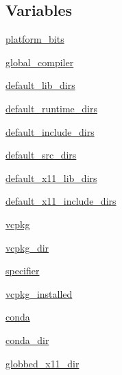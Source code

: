 \subsection*{Variables}
\begin{DoxyCompactItemize}
\item 
\hyperlink{namespacenumpy_1_1distutils_1_1system__info_a49973a987c3df34db822c3ed2da72f46}{platform\+\_\+bits}
\item 
\hyperlink{namespacenumpy_1_1distutils_1_1system__info_ac9242dc3ee8e9fc80481c8f0760fd765}{global\+\_\+compiler}
\item 
\hyperlink{namespacenumpy_1_1distutils_1_1system__info_ac60e6bb3dff22d8f4f250d1b4ba42899}{default\+\_\+lib\+\_\+dirs}
\item 
\hyperlink{namespacenumpy_1_1distutils_1_1system__info_a74309deda7e692fb45c89259009e7f12}{default\+\_\+runtime\+\_\+dirs}
\item 
\hyperlink{namespacenumpy_1_1distutils_1_1system__info_ad2cd2857056589dcb7cacb98be3d2b20}{default\+\_\+include\+\_\+dirs}
\item 
\hyperlink{namespacenumpy_1_1distutils_1_1system__info_a978557208c63efe4a826bee1f28eea4e}{default\+\_\+src\+\_\+dirs}
\item 
\hyperlink{namespacenumpy_1_1distutils_1_1system__info_adf31d5301e19d6a07260c1d4340cdb43}{default\+\_\+x11\+\_\+lib\+\_\+dirs}
\item 
\hyperlink{namespacenumpy_1_1distutils_1_1system__info_a8683212769cda6284c253c839b70dfd5}{default\+\_\+x11\+\_\+include\+\_\+dirs}
\item 
\hyperlink{namespacenumpy_1_1distutils_1_1system__info_a331508e056be601db0c53289f0e81edb}{vcpkg}
\item 
\hyperlink{namespacenumpy_1_1distutils_1_1system__info_af3d935af50b3590fe584a2f40a196ebb}{vcpkg\+\_\+dir}
\item 
\hyperlink{namespacenumpy_1_1distutils_1_1system__info_a2ad77a01032a052ac1f513a680c0b6bb}{specifier}
\item 
\hyperlink{namespacenumpy_1_1distutils_1_1system__info_a4120d506b88553509d16eda8f1c8610d}{vcpkg\+\_\+installed}
\item 
\hyperlink{namespacenumpy_1_1distutils_1_1system__info_a143f78ae85d53d3e0ba4ff4603532a79}{conda}
\item 
\hyperlink{namespacenumpy_1_1distutils_1_1system__info_a6086443465762a7d15a3644de91e3c9b}{conda\+\_\+dir}
\item 
\hyperlink{namespacenumpy_1_1distutils_1_1system__info_afc65a084842489d31e2cd154145c197f}{globbed\+\_\+x11\+\_\+dir}

\end{DoxyCompactItemize}
